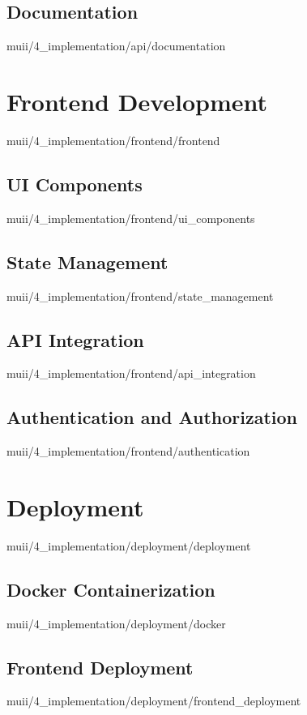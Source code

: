 \documentclass[english,epsbased,copyright,final,printable,covers,extendedindex,firstnumbered,tfm,gnuplot,loc,loe,lof,lot]{tfgtfmthesisuam}
\begin{document}
      \subsection{Documentation\label{SS:DOCS}}{muii/4_implementation/api/documentation}

    \section{Frontend Development\label{SEC:FRONTDEV}}{muii/4_implementation/frontend/frontend}
      \subsection{UI Components\label{SS:UICOMPS}}{muii/4_implementation/frontend/ui_components}
      \subsection{State Management\label{SS:STATEMAN}}{muii/4_implementation/frontend/state_management}
      \subsection{API Integration\label{SS:APIINTEG}}{muii/4_implementation/frontend/api_integration}
      \subsection{Authentication and Authorization\label{SS:AUTH}}{muii/4_implementation/frontend/authentication}

    \section{Deployment\label{SEC:DEPLOYMENT}}{muii/4_implementation/deployment/deployment}
      \subsection{Docker Containerization\label{SS:DOCKER}}{muii/4_implementation/deployment/docker}
      \subsection{Frontend Deployment\label{SS:FRONTDEPLOY}}{muii/4_implementation/deployment/frontend_deployment}
\end{document}

